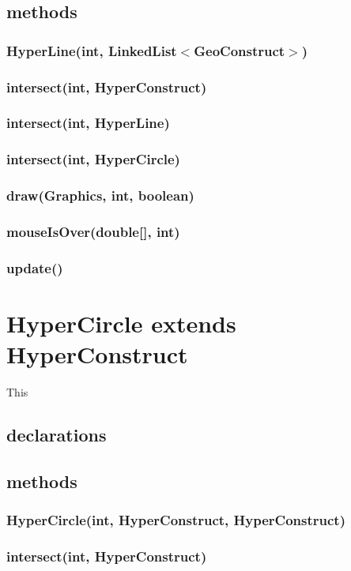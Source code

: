 \documentclass[a4paper,10pt]{report}
\begin{document}
\subsection{methods}
\subsubsection{HyperLine(int, LinkedList$<$GeoConstruct$>$)}
\subsubsection{intersect(int, HyperConstruct)}
\subsubsection{intersect(int, HyperLine)}
\subsubsection{intersect(int, HyperCircle)}
\subsubsection{draw(Graphics, int, boolean)}
\subsubsection{mouseIsOver(double[], int)}
\subsubsection{update()}
\section{HyperCircle extends HyperConstruct} This
\subsection{declarations}
\subsubsection{}
\subsection{methods}
\subsubsection{HyperCircle(int, HyperConstruct, HyperConstruct)}
\subsubsection{intersect(int, HyperConstruct)}
\end{document}

